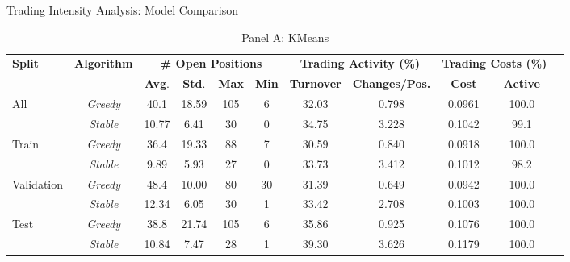 
\begin{table}[htbp] 
\caption{Trading Intensity Analysis: Model Comparison} 
\centering 
\label{tab:trading_intensity_comparison}

\begin{subtable}{\textwidth}
\caption{Panel A: KMeans}
\centering 
{\small
\begin{tabular}{lcccccccccc}
\toprule
\textbf{Split} & \textbf{Algorithm} & \multicolumn{4}{c}{\textbf{\# Open Positions}} & \multicolumn{2}{c}{\textbf{Trading Activity (\%)}} & \multicolumn{2}{c}{\textbf{Trading Costs (\%)}} \\
\cmidrule(lr{0.6em}){3-6} \cmidrule(lr{0.6em}){7-8} \cmidrule(lr{0.6em}){9-10}
& & \textbf{Avg}. & \textbf{Std}. & \textbf{Max} & \textbf{Min} & \textbf{Turnover} & \textbf{Changes/Pos.} & \textbf{Cost} & \textbf{Active} \\
\midrule
\multirow{2}{*}{All} & \textit{Greedy} & 40.1 & 18.59 & 105 & 6 & 32.03 & 0.798 & 0.0961 & 100.0 \\
 & \textit{Stable} & 10.77 & 6.41 & 30 & 0 & 34.75 & 3.228 & 0.1042 & 99.1 \\
\midrule
\multirow{2}{*}{Train} & \textit{Greedy} & 36.4 & 19.33 & 88 & 7 & 30.59 & 0.840 & 0.0918 & 100.0 \\
 & \textit{Stable} & 9.89 & 5.93 & 27 & 0 & 33.73 & 3.412 & 0.1012 & 98.2 \\
\midrule
\multirow{2}{*}{Validation} & \textit{Greedy} & 48.4 & 10.00 & 80 & 30 & 31.39 & 0.649 & 0.0942 & 100.0 \\
 & \textit{Stable} & 12.34 & 6.05 & 30 & 1 & 33.42 & 2.708 & 0.1003 & 100.0 \\
\midrule
\multirow{2}{*}{Test} & \textit{Greedy} & 38.8 & 21.74 & 105 & 6 & 35.86 & 0.925 & 0.1076 & 100.0 \\
 & \textit{Stable} & 10.84 & 7.47 & 28 & 1 & 39.30 & 3.626 & 0.1179 & 100.0 \\
\bottomrule
\end{tabular}
}
\end{subtable}

\vspace{0.6cm}


\end{table}
